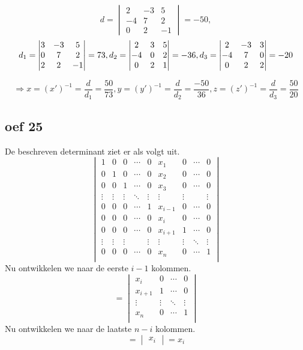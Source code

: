 \documentclass[10pt,a4paper]{article}
\begin{document}
\[  d = \begin{vmatrix}
            2 & -3 & 5\\
            -4 & 7 & 2\\
            0 & 2 & -1
    \end{vmatrix} = -50,\]
\[  d_1 = \begin{vmatrix}
        3 & -3 & 5\\
        0 & 7 & 2\\
        2 & 2 & -1
    \end{vmatrix} = 73,\\
    d_2 = \begin{vmatrix}
        2 & 3 & 5\\
        -4 & 0 & 2\\
        0 & 2 & 1
    \end{vmatrix} = -36,\\
    d_3 = \begin{vmatrix}
        2 & -3 & 3\\
        -4 & 7 & 0\\
        0 & 2 & 2
    \end{vmatrix} = -20
\]

\[\Rightarrow x = (x')^{-1}= \frac{d}{d_1} = \frac{50}{73},
    y = (y')^{-1}= \frac{d}{d_2} = \frac{-50}{36},
    z = (z')^{-1}= \frac{d}{d_3} = \frac{50}{20}
\]

\subsection*{oef 25}
De beschreven determinant ziet er als volgt uit.
\[
\begin{vmatrix}
1 & 0 & 0 & \cdots & 0 & x_1 & 0 & \cdots & 0 \\
0 & 1 & 0 & \cdots & 0 & x_2 & 0 & \cdots & 0 \\
0 & 0 & 1 & \cdots & 0 & x_3 & 0 & \cdots & 0 \\
\vdots & \vdots & \vdots & \ddots  & \vdots & \vdots & \vdots &  & \vdots\\
0 & 0 & 0 & \cdots & 1 & x_{i-1} & 0 &\cdots & 0 \\
0 & 0 & 0 & \cdots & 0 & x_i & 0 & \cdots & 0 \\
0 & 0 & 0 & \cdots & 0 & x_{i+1} & 1 & \cdots & 0 \\
\vdots & \vdots & \vdots &  & \vdots & \vdots & \vdots & \ddots & \vdots\\
0 & 0 & 0 & \cdots & 0 & x_n & 0 & \cdots & 1\\
\end{vmatrix}
\]
Nu ontwikkelen we naar de eerste $i-1$ kolommen.
\[
= 
\begin{vmatrix}
x_i & 0 & \cdots & 0 \\
x_{i+1} & 1 & \cdots & 0 \\
\vdots & \vdots & \ddots & \vdots\\
 x_n & 0 & \cdots & 1\\
\end{vmatrix}
\]
Nu ontwikkelen we naar de laatste $n -i$ kolommen.
\[
= 
\begin{vmatrix}
x_i
\end{vmatrix}
= x_i
\]
\end{document}
